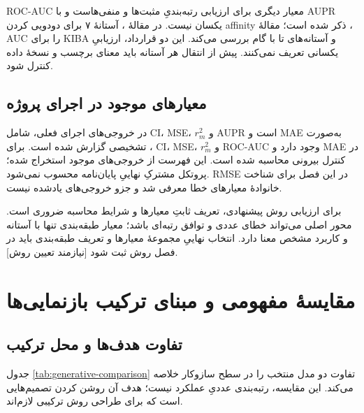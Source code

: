 ROC-AUC معیار دیگری برای ارزیابی رتبه‌بندیِ مثبت‌ها و منفی‌هاست و با AUPR یکسان نیست. در مقالهٔ ، آستانهٔ ۷ برای دودویی کردن affinity ذکر شده است؛ مقالهٔ ، AUC را برای KIBA و آستانه‌های  تا  با گام  بررسی می‌کند. این دو قرارداد، ارزیابیِ یکسانی تعریف نمی‌کنند. پیش از انتقال هر آستانه باید معنای برچسب و نسخهٔ داده کنترل شود.

\subsection{معیارهای موجود در اجرای پروژه}
در خروجی‌های اجرای فعلی،  شامل CI، MSE، $r_m^2$ و AUPR است و MAE به‌صورت تشخیصی گزارش شده است. برای ، CI، MSE، $r_m^2$ و ROC-AUC وجود دارد و MAE در کنترل بیرونی محاسبه شده است. این فهرست از خروجی‌های موجود استخراج شده؛ پروتکل مشترکِ نهاییِ پایان‌نامه محسوب نمی‌شود. RMSE در این فصل برای شناخت خانوادهٔ معیارهای خطا معرفی شد و جزو خروجی‌های یادشده نیست.

برای ارزیابی روش پیشنهادی، تعریف ثابتِ معیارها و شرایط محاسبه ضروری است. محور اصلی می‌تواند خطای عددی و توافق رتبه‌ای باشد؛ معیار طبقه‌بندی تنها با آستانه و کاربرد مشخص معنا دارد. انتخاب نهاییِ مجموعهٔ معیارها و تعریف طبقه‌بندی باید در فصل روش ثبت شود [نیازمند تعیین روش].

\clearpage
\section{مقایسهٔ مفهومی و مبنای ترکیب بازنمایی‌ها}
\label{sec:comparison-models}
\subsection{تفاوت هدف‌ها و محل ترکیب}
جدول \ref{tab:generative-comparison} تفاوت دو مدل منتخب را در سطح سازوکار خلاصه می‌کند. این مقایسه، رتبه‌بندی عددیِ عملکرد نیست؛ هدف آن روشن کردن تصمیم‌هایی است که برای طراحی روش ترکیبی لازم‌اند.

